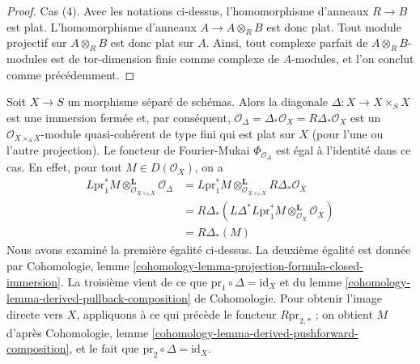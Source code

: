 \begin{proof}
\medskip\noindent
Cas (4). Avec les notations ci-dessus, l'homomorphisme d'anneaux $R \to B$ est plat.
L'homomorphisme d'anneaux $A \to A \otimes_R B$ est donc plat. Tout module projectif
sur $A \otimes_R B$ est donc plat sur $A$. Ainsi, tout complexe parfait de
$A \otimes_R B$-modules est de tor-dimension finie comme complexe
de $A$-modules, et l'on conclut comme précédemment.
\end{proof}

\begin{example}
\label{example-diagonal-fourier-mukai}
Soit $X \to S$ un morphisme séparé de schémas. Alors la diagonale
$\Delta : X \to X \times_S X$ est une immersion fermée et, par conséquent,
$\mathcal{O}_\Delta = \Delta_*\mathcal{O}_X = R\Delta_*\mathcal{O}_X$
est un $\mathcal{O}_{X \times_S X}$-module quasi-cohérent de type fini
qui est plat sur $X$ (pour l'une ou l'autre projection). Le foncteur de Fourier-Mukai
$\Phi_{\mathcal{O}_\Delta}$ est égal à l'identité dans ce cas.
En effet, pour tout $M \in D(\mathcal{O}_X)$, on a
\begin{align*}
L\text{pr}_1^*M \otimes_{\mathcal{O}_{X \times_S X}}^\mathbf{L}
\mathcal{O}_\Delta
& =
L\text{pr}_1^*M \otimes_{\mathcal{O}_{X \times_S X}}^\mathbf{L}
R\Delta_*\mathcal{O}_X \\
& =
R\Delta_*(
L\Delta^*L\text{pr}_1^*M \otimes_{\mathcal{O}_X}^\mathbf{L} \mathcal{O}_X) \\
& =
R\Delta_*(M)
\end{align*}
Nous avons examiné la première égalité ci-dessus.
La deuxième égalité est donnée par Cohomologie, lemme
\ref{cohomology-lemma-projection-formula-closed-immersion}.
La troisième vient de ce que $\text{pr}_1 \circ \Delta = \text{id}_X$ et du
lemme \ref{cohomology-lemma-derived-pullback-composition} de Cohomologie.
Pour obtenir l'image directe vers $X$, appliquons à ce qui précède le foncteur $R\text{pr}_{2, *}$ ;
on obtient $M$ d'après
Cohomologie, lemme \ref{cohomology-lemma-derived-pushforward-composition},
et le fait que $\text{pr}_2 \circ \Delta = \text{id}_X$.
\end{example}

